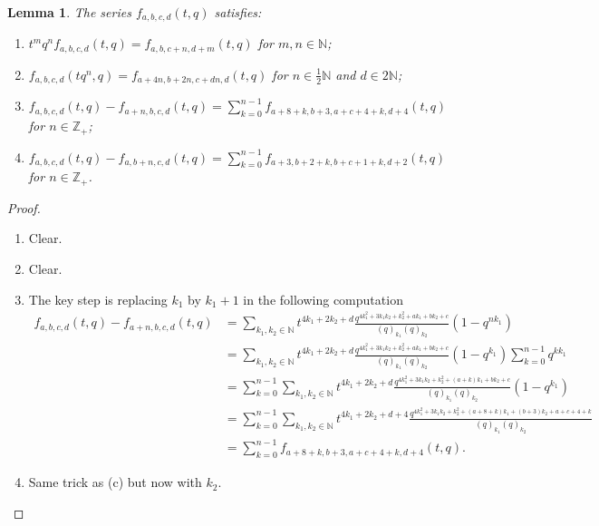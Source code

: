 \documentclass[a4paper, 12pt, reqno]{amsart}
\newtheorem{lemma}[theorem]{Lemma}
\theoremstyle{remark}
\begin{document}
\begin{lemma}
  \label{lmm:1}
  The series $f_{a, b, c, d}(t, q)$ satisfies:
  \begin{enumerate}
  \item $t^mq^nf_{a, b, c, d}(t, q) = f_{a, b, c + n, d + m}(t, q)$ for $m, n \in \mathbb{N}$;
  \item $f_{a, b, c, d}(tq^n, q) = f_{a + 4n, b + 2n, c + dn, d}(t, q)$ for $n \in \frac{1}{2}\mathbb{N}$ and $ d \in 2\mathbb{N}$;
  \item $f_{a, b, c, d}(t, q) - f_{a + n, b, c, d}(t, q) = \sum_{k = 0}^{n - 1}f_{a + 8 + k, b + 3, a + c + 4 + k, d + 4}(t, q)$ for $n \in \mathbb{Z}_+$;
  \item $f_{a, b, c, d}(t, q) - f_{a, b + n, c, d}(t, q) = \sum_{k = 0}^{n - 1}f_{a + 3, b + 2 + k, b + c + 1 + k, d + 2}(t, q)$ for $n \in \mathbb{Z}_+$.
  \end{enumerate}
\end{lemma}

\begin{proof}\leavevmode
  \begin{enumerate}
  \item Clear.
  \item Clear.
  \item The key step is replacing $k_1$ by $k_1 + 1$ in the following computation
    \begin{align*}
      f_{a, b, c, d}(t, q) - f_{a + n, b, c, d}(t, q) &= \sum_{k_1, k_2 \in \mathbb{N}}t^{4k_1 + 2k_2 + d}\frac{q^{4k_1^2 + 3k_1k_2 + k_2^2 + ak_1 + bk_2 + c}}{(q)_{k_1}(q)_{k_2}}(1 - q^{nk_1}) \\
      &= \sum_{k_1, k_2 \in \mathbb{N}}t^{4k_1 + 2k_2 + d}\frac{q^{4k_1^2 + 3k_1k_2 + k_2^2 + ak_1 + bk_2 + c}}{(q)_{k_1}(q)_{k_2}}(1 - q^{k_1})\sum_{k = 0}^{n - 1}q^{kk_1} \\
      &= \sum_{k = 0}^{n - 1}\sum_{k_1, k_2 \in \mathbb{N}}t^{4k_1 + 2k_2 + d}\frac{q^{4k_1^2 + 3k_1k_2 + k_2^2 + (a + k)k_1 + bk_2 + c}}{(q)_{k_1}(q)_{k_2}}(1 - q^{k_1}) \\
      &= \sum_{k = 0}^{n - 1}\sum_{k_1, k_2 \in \mathbb{N}}t^{4k_1 + 2k_2 + d + 4}\frac{q^{4k_1^2 + 3k_1k_2 + k_2^2 + (a + 8 + k)k_1 + (b + 3)k_2 + a + c + 4 + k}}{(q)_{k_1}(q)_{k_2}} \\
      &= \sum_{k = 0}^{n - 1}f_{a + 8 + k, b + 3, a + c + 4 + k, d + 4}(t, q).
    \end{align*}
  \item Same trick as (c) but now with $k_2$. \qedhere
  \end{enumerate}
\end{proof}
\end{document}
